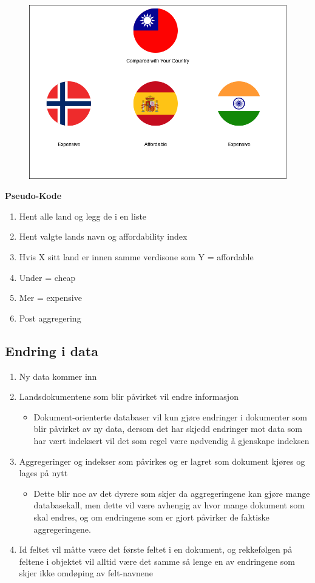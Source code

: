 \FigureCounter
\begin{figure}[H]
  \includegraphics[scale=0.5]{images/milepael3/countriesComparedByExpensiveness.png}
\end{figure}

\textbf{Pseudo-Kode}
\begin{enumerate}
  \item Hent alle land og legg de i en liste
  \item Hent valgte lands navn og affordability index
  \item Hvis X sitt land er innen samme verdisone som Y = affordable
  \item Under = cheap
  \item Mer = expensive
  \item Post aggregering
\end{enumerate}

\subsection{Endring i data}
\begin{enumerate}
  \item Ny data kommer inn
  \item Landsdokumentene som blir påvirket vil endre informasjon
  \begin{itemize}
    \item Dokument-orienterte databaser vil kun gjøre endringer i dokumenter som blir påvirket av ny data, dersom det har skjedd endringer mot data som har vært indeksert vil det som regel være nødvendig å gjenskape indeksen
  \end{itemize}
  \item Aggregeringer og indekser som påvirkes og er lagret som dokument kjøres og lages på nytt
  \begin{itemize}
    \item Dette blir noe av det dyrere som skjer da aggregeringene kan gjøre mange databasekall, men dette vil være avhengig av hvor mange dokument som skal endres,
    og om endringene som er gjort påvirker de faktiske aggregeringene.
  \end{itemize}
  \item Id feltet vil måtte være det første feltet i en dokument, og rekkefølgen på feltene i objektet vil alltid være det samme så lenge en av endringene som skjer ikke omdøping av felt-navnene 
\end{enumerate}